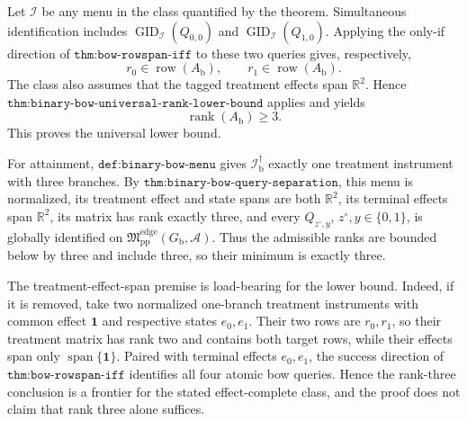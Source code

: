 Let \(\mathcal I\) be any menu in the class quantified by the theorem.  Simultaneous identification includes \(\operatorname{GID}_{\mathcal I}(Q_{0,0})\) and \(\operatorname{GID}_{\mathcal I}(Q_{1,0})\).  Applying the only-if direction of \(\texttt{thm:bow-rowspan-iff}\) to these two queries gives, respectively,
\[
r_0\in\operatorname{row}(A_{\mathrm b}),
\qquad
r_1\in\operatorname{row}(A_{\mathrm b}).
\]
The class also assumes that the tagged treatment effects span \(\mathbb R^2\).  Hence \(\texttt{thm:binary-bow-universal-rank-lower-bound}\) applies and yields
\[
\operatorname{rank}(A_{\mathrm b})\ge3.
\]
This proves the universal lower bound.

For attainment, \(\texttt{def:binary-bow-menu}\) gives \(\mathcal I_{\mathrm b}^{\dagger}\) exactly one treatment instrument with three branches.  By \(\texttt{thm:binary-bow-query-separation}\), this menu is normalized, its treatment effect and state spans are both \(\mathbb R^2\), its terminal effects span \(\mathbb R^2\), its matrix has rank exactly three, and every \(Q_{z^{\circ},y}\), \(z^{\circ},y\in\{0,1\}\), is globally identified on \(\mathfrak M_{\mathrm{pp}}^{\mathrm{edge}}(G_{\mathrm b},\mathcal A)\).  Thus the admissible ranks are bounded below by three and include three, so their minimum is exactly three.

The treatment-effect-span premise is load-bearing for the lower bound.  Indeed, if it is removed, take two normalized one-branch treatment instruments with common effect \(\mathbf 1\) and respective states \(e_0,e_1\).  Their two rows are \(r_0,r_1\), so their treatment matrix has rank two and contains both target rows, while their effects span only \(\operatorname{span}\{\mathbf 1\}\).  Paired with terminal effects \(e_0,e_1\), the success direction of \(\texttt{thm:bow-rowspan-iff}\) identifies all four atomic bow queries.  Hence the rank-three conclusion is a frontier for the stated effect-complete class, and the proof does not claim that rank three alone suffices.